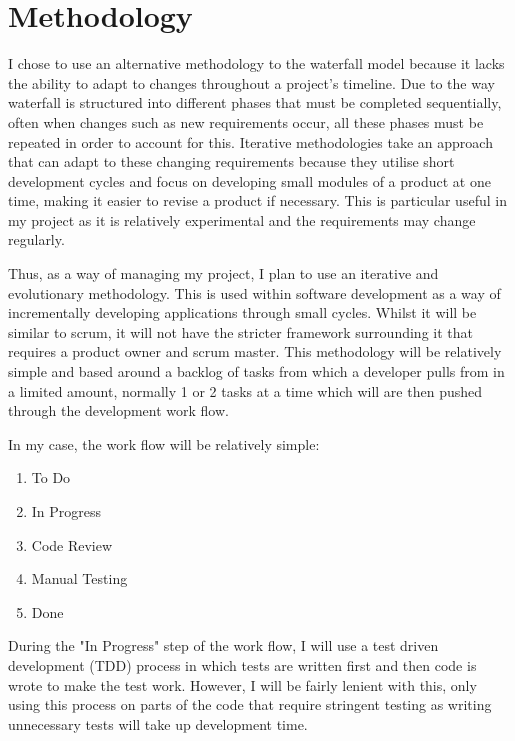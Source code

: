 \documentclass[]{report}
\begin{document}
	\chapter{Methodology}
	I chose to use an alternative methodology to the waterfall model because it lacks the ability to adapt to changes throughout a project's timeline. Due to the way waterfall is structured into different phases that must be completed sequentially, often when changes such as new requirements occur, all these phases must be repeated in order to account for this. Iterative methodologies take an approach that can adapt to these changing requirements because they utilise short development cycles and focus on developing small modules of a product at one time, making it easier to revise a product if necessary. This is particular useful in my project as it is relatively experimental and the requirements may change regularly. 
		
	Thus, as a way of managing my project, I plan to use an iterative and evolutionary methodology. This is used within software development as a way of incrementally developing applications through small cycles. Whilst it will be similar to scrum, it will not have the stricter framework surrounding it that requires a product owner and scrum master. This methodology will be relatively simple and based around a backlog of tasks from which a developer pulls from in a limited amount, normally 1 or 2 tasks at a time which will are then pushed through the development work flow.
		
	In my case, the work flow will be relatively simple:
	\begin{enumerate}
		\item To Do
		\item In Progress
		\item Code Review
		\item Manual Testing
		\item Done
	\end{enumerate}
		
	During the "In Progress" step of the work flow, I will use a test driven development (TDD) process in which tests are written first and then code is wrote to make the test work. However, I will be fairly lenient with this, only using this process on parts of the code that require stringent testing as writing unnecessary tests will take up development time. 
	
\end{document}
